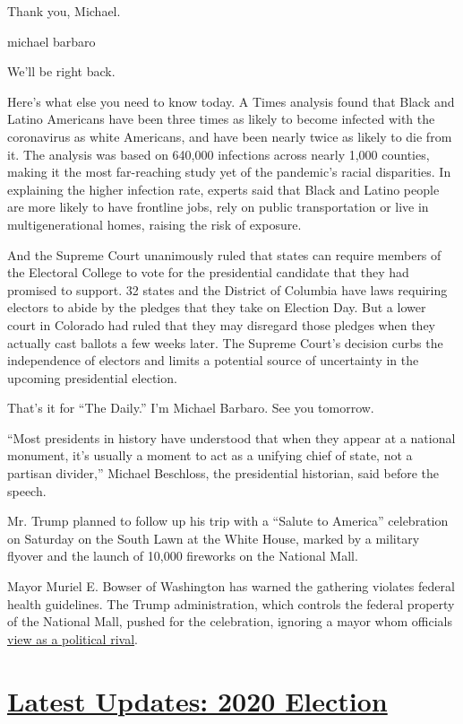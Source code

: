 Thank you, Michael.

michael barbaro

We'll be right back.

Here's what else you need to know today. A Times analysis found that
Black and Latino Americans have been three times as likely to become
infected with the coronavirus as white Americans, and have been nearly
twice as likely to die from it. The analysis was based on 640,000
infections across nearly 1,000 counties, making it the most far-reaching
study yet of the pandemic's racial disparities. In explaining the higher
infection rate, experts said that Black and Latino people are more
likely to have frontline jobs, rely on public transportation or live in
multigenerational homes, raising the risk of exposure.

And the Supreme Court unanimously ruled that states can require members
of the Electoral College to vote for the presidential candidate that
they had promised to support. 32 states and the District of Columbia
have laws requiring electors to abide by the pledges that they take on
Election Day. But a lower court in Colorado had ruled that they may
disregard those pledges when they actually cast ballots a few weeks
later. The Supreme Court's decision curbs the independence of electors
and limits a potential source of uncertainty in the upcoming
presidential election.

That's it for ``The Daily.'' I'm Michael Barbaro. See you tomorrow.

``Most presidents in history have understood that when they appear at a
national monument, it's usually a moment to act as a unifying chief of
state, not a partisan divider,'' Michael Beschloss, the presidential
historian, said before the speech.

Mr. Trump planned to follow up his trip with a ``Salute to America''
celebration on Saturday on the South Lawn at the White House, marked by
a military flyover and the launch of 10,000 fireworks on the National
Mall.

Mayor Muriel E. Bowser of Washington has warned the gathering violates
federal health guidelines. The Trump administration, which controls the
federal property of the National Mall, pushed for the celebration,
ignoring a mayor whom officials
\href{https://www.nytimes.com/2020/06/05/us/politics/muriel-bowser-trump.html}{view
as a political rival}.

\hypertarget{latest-updates-2020-election}{%
\section{\texorpdfstring{\href{https://www.nytimes.com/2020/07/31/us/elections/biden-vs-trump.html?action=click\&pgtype=Article\&state=default\&region=MAIN_CONTENT_1\&context=storylines_live_updates}{Latest
Updates: 2020
Election}}{Latest Updates: 2020 Election}}\label{latest-updates-2020-election}}

